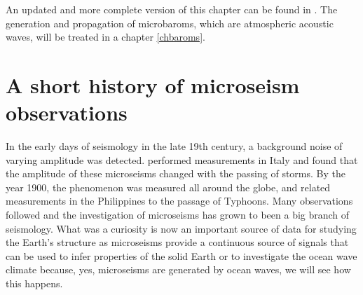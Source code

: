 An updated and more complete version of this chapter can be found in \cite{Ardhuin&al.2019}. 
The generation and propagation of microbaroms, which are atmospheric acoustic waves, will be treated in a chapter \ref{chbaroms}.

\section{A short history of microseism observations}
In the early days of seismology in the late 19th century, a background 
noise of varying amplitude was detected. \cite{Bertelli1872} performed measurements in Italy and  found that the amplitude of these microseisms changed 
with the passing of storms. By the year 1900, the phenomenon was measured all around the globe, and \cite{Algue1900} related measurements in the Philippines to the passage of Typhoons.  Many observations 
followed and the investigation of microseisms has grown to been a big branch of seismology. What was a curiosity is now an important source of data for studying the Earth's structure as microseisms provide a continuous source of signals that can be used to infer properties of the solid Earth \citep{Shapiro&al.2005} or to investigate the ocean wave climate \citep{Zopf&al.1976} because, yes, microseisms are generated by 
ocean waves, we will see how this happens. 

